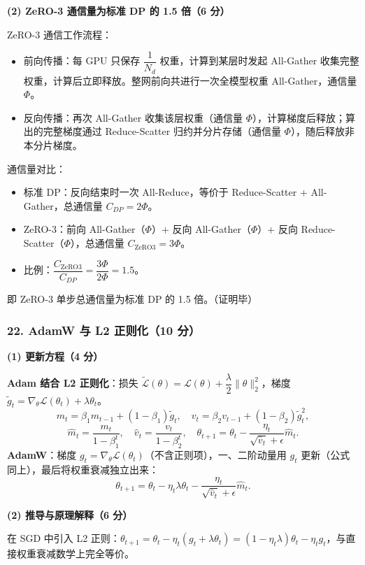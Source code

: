\documentclass[11pt,a4paper]{article}
\begin{document}
\noindent\textbf{(2) ZeRO-3 通信量为标准 DP 的 1.5 倍（6 分）}

ZeRO-3 通信工作流程：
\begin{itemize}[leftmargin=2em,itemsep=0pt,parsep=0pt,topsep=0pt]
  \item 前向传播：每 GPU 只保存 $\dfrac{1}{N_d}$ 权重，计算到某层时发起 All-Gather 收集完整权重，计算后立即释放。整网前向共进行一次全模型权重 All-Gather，通信量 $\Phi$。
  \item 反向传播：再次 All-Gather 收集该层权重（通信量 $\Phi$），计算梯度后释放；算出的完整梯度通过 Reduce-Scatter 归约并分片存储（通信量 $\Phi$），随后释放非本分片梯度。
\end{itemize}
通信量对比：
\begin{itemize}[leftmargin=2em,itemsep=0pt,parsep=0pt,topsep=0pt]
  \item 标准 DP：反向结束时一次 All-Reduce，等价于 Reduce-Scatter + All-Gather，总通信量 $C_{DP}=2\Phi$。
  \item ZeRO-3：前向 All-Gather（$\Phi$）+ 反向 All-Gather（$\Phi$）+ 反向 Reduce-Scatter（$\Phi$），总通信量 $C_{\text{ZeRO3}}=3\Phi$。
  \item 比例：$\dfrac{C_{\text{ZeRO3}}}{C_{DP}}=\dfrac{3\Phi}{2\Phi}=1.5$。
\end{itemize}
即 ZeRO-3 单步总通信量为标准 DP 的 1.5 倍。（证明毕）

\subsubsection*{22. AdamW 与 L2 正则化（10 分）}

\noindent\textbf{(1) 更新方程（4 分）}

\textbf{Adam 结合 L2 正则化}：损失 $\tilde{\mathcal{L}}(\theta)=\mathcal{L}(\theta)+\dfrac{\lambda}{2}\|\theta\|_2^2$，梯度 $\tilde{g}_t=\nabla_\theta\mathcal{L}(\theta_t)+\lambda\theta_t$。
\[
m_t=\beta_1 m_{t-1}+(1-\beta_1)\tilde{g}_t,\quad v_t=\beta_2 v_{t-1}+(1-\beta_2)\tilde{g}_t^2,
\]
\[
\hat{m}_t=\frac{m_t}{1-\beta_1^t},\quad\hat{v}_t=\frac{v_t}{1-\beta_2^t},\quad\theta_{t+1}=\theta_t-\frac{\eta_t}{\sqrt{\hat{v}_t}+\epsilon}\hat{m}_t.
\]
\textbf{AdamW}：梯度 $g_t=\nabla_\theta\mathcal{L}(\theta_t)$（不含正则项），一、二阶动量用 $g_t$ 更新（公式同上），最后将权重衰减独立出来：
\[
\theta_{t+1}=\theta_t-\eta_t\lambda\theta_t-\frac{\eta_t}{\sqrt{\hat{v}_t}+\epsilon}\hat{m}_t.
\]

\noindent\textbf{(2) 推导与原理解释（6 分）}

在 SGD 中引入 L2 正则：$\theta_{t+1}=\theta_t-\eta_t(g_t+\lambda\theta_t)=(1-\eta_t\lambda)\theta_t-\eta_t g_t$，与直接权重衰减数学上完全等价。
\end{document}

